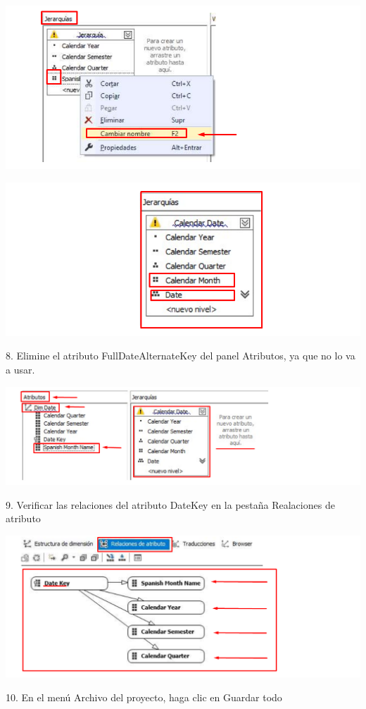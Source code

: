 	\begin{center}
	\includegraphics[width=\columnwidth]{images/task5/img3}
	\end{center}	

	\begin{center}
	\includegraphics[width=\columnwidth]{images/task5/img4}
	\end{center}	

8. Elimine el atributo FullDateAlternateKey del panel Atributos, ya que no lo va a usar.

	\begin{center}
	\includegraphics[width=\columnwidth]{images/task5/img5}
	\end{center}	

9. Verificar las relaciones del atributo DateKey en la pestaña Realaciones de atributo

	\begin{center}
	\includegraphics[width=\columnwidth]{images/task5/img6}
	\end{center}	

10. En el menú Archivo del proyecto, haga clic en Guardar todo

    
